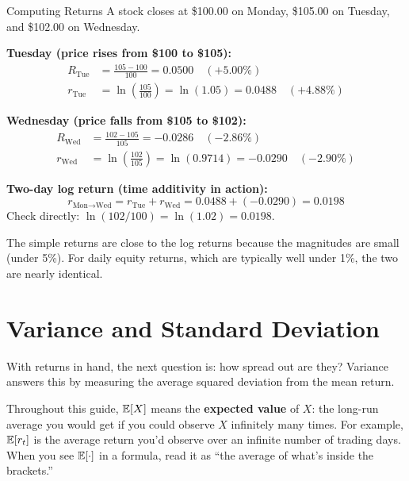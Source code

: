 \begin{workedexample}{Computing Returns}
A stock closes at \$100.00 on Monday, \$105.00 on Tuesday, and \$102.00 on Wednesday.

\textbf{Tuesday (price rises from \$100 to \$105):}
\begin{align*}
  R_{\text{Tue}} &= \frac{105 - 100}{100} = 0.0500 \quad (+5.00\%) \\[4pt]
  r_{\text{Tue}} &= \ln\!\left(\frac{105}{100}\right) = \ln(1.05) = 0.0488 \quad (+4.88\%)
\end{align*}

\textbf{Wednesday (price falls from \$105 to \$102):}
\begin{align*}
  R_{\text{Wed}} &= \frac{102 - 105}{105} = -0.0286 \quad (-2.86\%) \\[4pt]
  r_{\text{Wed}} &= \ln\!\left(\frac{102}{105}\right) = \ln(0.9714) = -0.0290 \quad (-2.90\%)
\end{align*}

\textbf{Two-day log return (time additivity in action):}
\[
  r_{\text{Mon}\to\text{Wed}} = r_{\text{Tue}} + r_{\text{Wed}} = 0.0488 + (-0.0290) = 0.0198
\]
Check directly: $\ln(102/100) = \ln(1.02) = 0.0198$. \checkmark

The simple returns are close to the log returns because the magnitudes are small (under 5\%).
For daily equity returns, which are typically well under 1\%, the two are nearly identical.
\end{workedexample}

\section{Variance and Standard Deviation}
\label{sec:variance}

With returns in hand, the next question is: how spread out are they?
Variance answers this by measuring the average squared deviation from the mean return.

\begin{prereq}
Throughout this guide, $\mathbb{E}[X]$ means the \textbf{expected value} of $X$: the long-run average you would get if you could observe $X$ infinitely many times.
For example, $\mathbb{E}[r_t]$ is the average return you'd observe over an infinite number of trading days.
When you see $\mathbb{E}[\cdot]$ in a formula, read it as ``the average of what's inside the brackets.''
\end{prereq}

